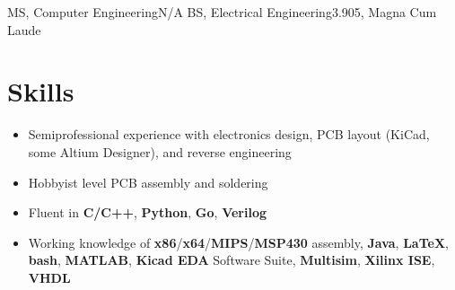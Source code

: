 \documentclass{my_resume}
\begin{document}

    {MS, Computer Engineering}{N/A}
	{BS, Electrical Engineering}{3.905, Magna Cum Laude}

\section{Skills}
\begin{itemize}
    \item Semiprofessional experience with electronics design, PCB layout (KiCad, some Altium Designer), and reverse engineering
    \item Hobbyist level PCB assembly and soldering
    \item Fluent in \textbf{C/C++}, \textbf{Python}, \textbf{Go}, \textbf{Verilog}
    \item Working knowledge of \textbf{x86}/\textbf{x64}/\textbf{MIPS}/\textbf{MSP430} assembly, \textbf{Java}, \textbf{LaTeX}, \textbf{bash}, \textbf{MATLAB}, \textbf{Kicad EDA} Software Suite, \textbf{Multisim}, \textbf{Xilinx ISE}, \textbf{VHDL}
\end{itemize}
\end{document}
